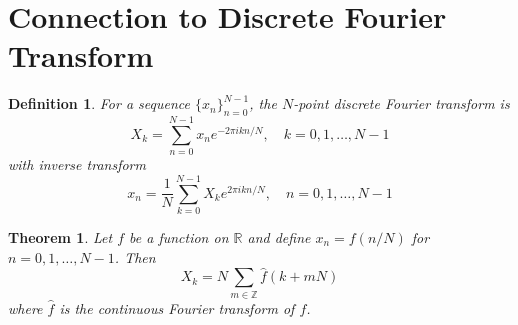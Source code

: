 \documentclass{article}
\newtheorem{theorem}{Theorem}
\newtheorem{definition}{Definition}
\begin{document}
\section{Connection to Discrete Fourier Transform}

\begin{definition}
For a sequence $\{x_n\}_{n=0}^{N-1}$, the $N$-point discrete Fourier transform is
\begin{equation}
\label{eq:dft}
X_k = \sum_{n=0}^{N-1} x_n e^{-2\pi i k n / N}, \quad k = 0, 1, \ldots, N-1
\end{equation}
with inverse transform
\begin{equation}
\label{eq:idft}
x_n = \frac{1}{N} \sum_{k=0}^{N-1} X_k e^{2\pi i k n / N}, \quad n = 0, 1, \ldots, N-1
\end{equation}
\end{definition}

\begin{theorem}
Let $f$ be a function on $\mathbb{R}$ and define $x_n = f(n/N)$ for $n = 0, 1, \ldots, N-1$. Then
\begin{equation}
\label{eq:dft_poisson_relation}
X_k = N \sum_{m \in \mathbb{Z}} \hat{f}(k + mN)
\end{equation}
where $\hat{f}$ is the continuous Fourier transform of $f$.
\end{theorem}
\end{document}
